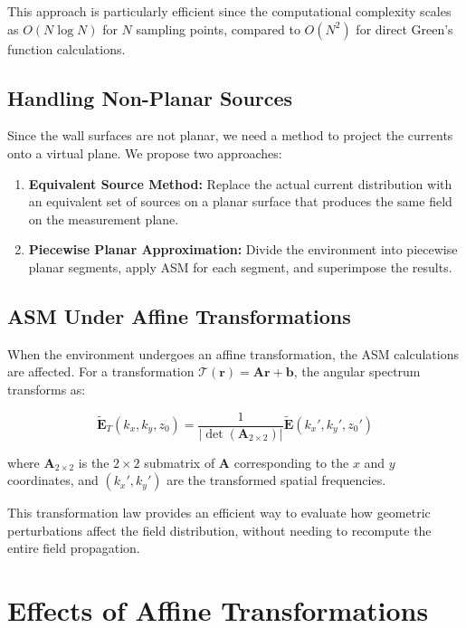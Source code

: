 \documentclass[12pt,a4paper]{article}
\begin{document}
This approach is particularly efficient since the computational complexity scales as $O(N \log N)$ for $N$ sampling points, compared to $O(N^2)$ for direct Green's function calculations.

\subsection{Handling Non-Planar Sources}

Since the wall surfaces are not planar, we need a method to project the currents onto a virtual plane. We propose two approaches:

\begin{enumerate}
    \item \textbf{Equivalent Source Method:} Replace the actual current distribution with an equivalent set of sources on a planar surface that produces the same field on the measurement plane.

    \item \textbf{Piecewise Planar Approximation:} Divide the environment into piecewise planar segments, apply ASM for each segment, and superimpose the results.
\end{enumerate}

\subsection{ASM Under Affine Transformations}

When the environment undergoes an affine transformation, the ASM calculations are affected. For a transformation $\mathcal{T}(\mathbf{r}) = \mathbf{A}\mathbf{r} + \mathbf{b}$, the angular spectrum transforms as:

\begin{equation}
    \tilde{\mathbf{E}}_T(k_x, k_y, z_0) = \frac{1}{|\det(\mathbf{A}_{2\times2})|} \tilde{\mathbf{E}}(k_x', k_y', z_0')
\end{equation}

where $\mathbf{A}_{2\times2}$ is the $2 \times 2$ submatrix of $\mathbf{A}$ corresponding to the $x$ and $y$ coordinates, and $(k_x', k_y')$ are the transformed spatial frequencies.

This transformation law provides an efficient way to evaluate how geometric perturbations affect the field distribution, without needing to recompute the entire field propagation.

\section{Effects of Affine Transformations}
\end{document}
